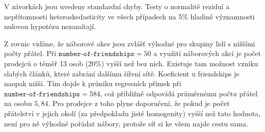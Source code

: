 \documentclass[a4wide,12pt]{report}
\begin{document}
V závorkách jsou uvedeny standardní chyby. Testy o normalitě reziduí a nepřítomnosti heteroskedasticity ve všech případech na 5\% hladině významnosti nulovou hypotézu nezamítají.

Z rovnic vidíme, že náborové akce jsou zvlášť výhodné pro skupiny lidí s nižšími počty přátel. Při $\texttt{number-of-friendships}=50$ a využití náborových akcí je počet prodejců o téměř 13 osob (20\%) vyšší než bez nich.
Existuje tam možnost vzniku slabých článků, které zabrání dalšímu šíření sítě. Koeficient u friendships je naopak nižší. Tím dojde k průniku regresních přímek při $\texttt{number-of-friendships}=584$, což přibližně odpovídá průměrnému počtu přátel na osobu $5,84$. Pro prodejce z toho plyne doporučení, že pokud je počet přátelství v jejich okolí (za předpokladu jisté homogenity) vyšší než tato hodnota, není pro ně výhodné pořádat nábory, protože síť si ke všem najde cestu sama.
\end{document}
